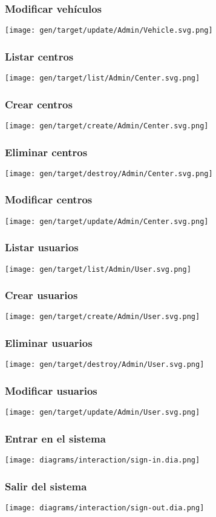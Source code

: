 \subsubsection{Modificar vehículos}
\texttt{[image: gen/target/update/Admin/Vehicle.svg.png]}

\subsubsection{Listar centros}
\texttt{[image: gen/target/list/Admin/Center.svg.png]}

\subsubsection{Crear centros}
\texttt{[image: gen/target/create/Admin/Center.svg.png]}

\subsubsection{Eliminar centros}
\texttt{[image: gen/target/destroy/Admin/Center.svg.png]}

\subsubsection{Modificar centros}
\texttt{[image: gen/target/update/Admin/Center.svg.png]}

\subsubsection{Listar usuarios}
\texttt{[image: gen/target/list/Admin/User.svg.png]}

\subsubsection{Crear usuarios}
\texttt{[image: gen/target/create/Admin/User.svg.png]}

\subsubsection{Eliminar usuarios}
\texttt{[image: gen/target/destroy/Admin/User.svg.png]}

\subsubsection{Modificar usuarios}
\texttt{[image: gen/target/update/Admin/User.svg.png]}

\subsubsection{Entrar en el sistema}
\texttt{[image: diagrams/interaction/sign-in.dia.png]}

\subsubsection{Salir del sistema}
\texttt{[image: diagrams/interaction/sign-out.dia.png]}

